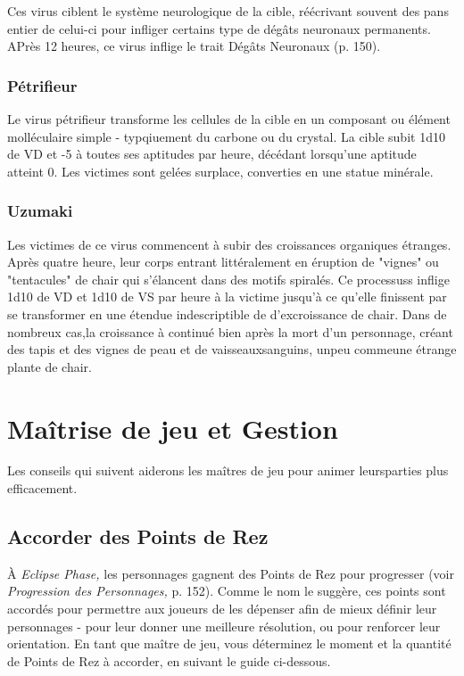Ces virus ciblent le système neurologique de la cible, réécrivant souvent des pans entier de celui-ci pour infliger certains type de dégâts neuronaux permanents. APrès 12 heures, ce virus inflige le trait Dégâts Neuronaux (p. 150). 

\subsubsection{Pétrifieur} 

Le virus pétrifieur transforme les cellules de la cible en un composant ou élément molléculaire simple - typqiuement du carbone ou du crystal. La cible subit 1d10 de VD et -5 à toutes ses aptitudes par heure, décédant lorsqu'une aptitude atteint 0. Les victimes sont gelées surplace, converties en une statue minérale. 

\subsubsection{Uzumaki} 

Les victimes de ce virus commencent à subir des croissances organiques étranges. Après quatre heure, leur corps entrant littéralement en éruption de "vignes" ou "tentacules" de chair qui s'élancent dans des motifs spiralés. Ce processuss inflige 1d10 de VD et 1d10 de VS par heure à la victime jusqu'à ce qu'elle finissent par se transformer en une étendue indescriptible de d'excroissance de chair. Dans de nombreux cas,la croissance à continué bien après la mort d'un personnage, créant des tapis et des vignes de peau et de vaisseauxsanguins, unpeu commeune étrange plante de chair. 

\section{Maîtrise de jeu et Gestion } 

Les conseils qui suivent aiderons les maîtres de jeu pour animer leursparties plus efficacement. 

\subsection{Accorder des Points de Rez} 

À \textit{Eclipse Phase,} les personnages gagnent des Points de Rez pour progresser (voir \textit{Progression des Personnages,} p. 152). Comme le nom le suggère, ces points sont accordés pour permettre aux joueurs de les dépenser afin de mieux définir leur personnages - pour leur donner une meilleure résolution, ou pour renforcer leur orientation. En tant que maître de jeu, vous déterminez le moment et la quantité de Points de Rez à accorder, en suivant le guide ci-dessous. 

